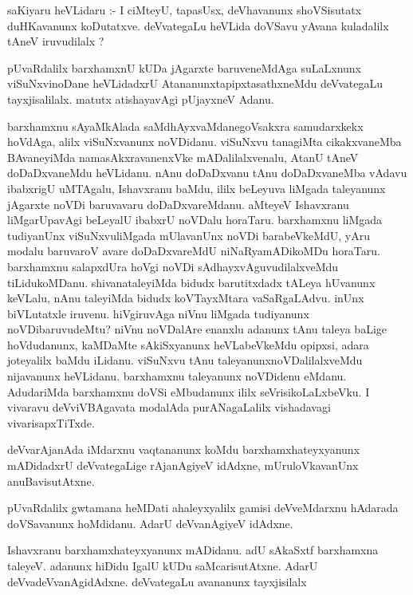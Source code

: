 \documentclass{article}
\begin{document}
\begin{mn}
saKiyaru heVLidaru :- I ciMteyU, tapasUsx,  deVhavanunx shoVSisutatx duHKavanunx 
koDutatxve. deVvategaLu heVLida doVSavu yAvana kuladalilx tAneV iruvudilalx ?
\end{mn}

\begin{mn}
pUvaRdalilx barxhamxnU kUDa jAgarxte baruveneMdAga suLaLxnunx viSuNxvinoDane heVLidadxrU 
AtananunxtapipxtasathxneMdu deVvategaLu  tayxjisalilalx. matutx atishayavAgi pUjayxneV Adanu.
\end{mn}

\begin{mn}
barxhamxnu sAyaMkAlada saMdhAyxvaMdanegoVsakxra samudarxkekx hoVdAga, alilx 
viSuNxvanunx noVDidanu.  viSuNxvu tanagiMta cikakxvaneMba BAvaneyiMda 
namasAkxravanenxVke mADalilalxvenalu, AtanU tAneV doDaDxvaneMdu heVLidanu.  
nAnu doDaDxvanu tAnu doDaDxvaneMba vAdavu ibabxrigU uMTAgalu, Ishavxranu baMdu, 
ililx beLeyuva liMgada taleyanunx jAgarxte noVDi baruvavaru doDaDxvareMdanu.  
aMteyeV Ishavxranu liMgarUpavAgi beLeyalU ibabxrU noVDalu horaTaru.  barxhamxnu 
liMgada tudiyanUnx viSuNxvuliMgada mUlavanUnx noVDi barabeVkeMdU, yAru modalu 
baruvaroV avare  doDaDxvareMdU niNaRyamADikoMDu  horaTaru.  barxhamxnu salapxdUra 
hoVgi noVDi sAdhayxvAguvudilalxveMdu tiLidukoMDanu. shivanataleyiMda bidudx 
barutitxdadx tALeya hUvanunx keVLalu, nAnu taleyiMda bidudx koVTayxMtara 
vaSaRgaLAdvu.  inUnx biVLutatxle iruvenu. hiVgiruvAga niVnu liMgada tudiyanunx 
noVDibaruvudeMtu? niVnu noVDalAre enanxlu adanunx tAnu taleya baLige hoVdudanunx, 
kaMDaMte sAkiSxyanunx heVLabeVkeMdu opipxsi, adara joteyalilx baMdu iLidanu.  
viSuNxvu tAnu taleyanunxnoVDalilalxveMdu nijavanunx heVLidanu. barxhamxnu 
taleyanunx noVDidenu eMdanu. AdudariMda barxhamxnu doVSi eMbudanunx ililx 
seVrisikoLaLxbeVku. I vivaravu deVviVBAgavata modalAda purANagaLalilx vishadavagi vivarisapxTiTxde.
\end{mn}

\begin{mn}
deVvarAjanAda  iMdarxnu vaqtananunx koMdu barxhamxhateyxyanunx mADidadxrU 
deVvategaLige rAjanAgiyeV idAdxne,  mUruloVkavanUnx anuBavisutAtxne.  
\end{mn}

\begin{mn}
pUvaRdalilx gwtamana heMDati ahaleyxyalilx gamisi deVveMdarxnu hAdarada 
doVSavanunx hoMdidanu.  AdarU deVvanAgiyeV idAdxne. 
\end{mn}

\begin{mn}
Ishavxranu  barxhamxhateyxyanunx  mADidanu. adU sAkaSxtf barxhamxna taleyeV. adanunx hiDidu 
IgalU kUDu saMcarisutAtxne. AdarU deVvadeVvanAgidAdxne. deVvategaLu avananunx tayxjisilalx
\end{mn}
\end{document}
